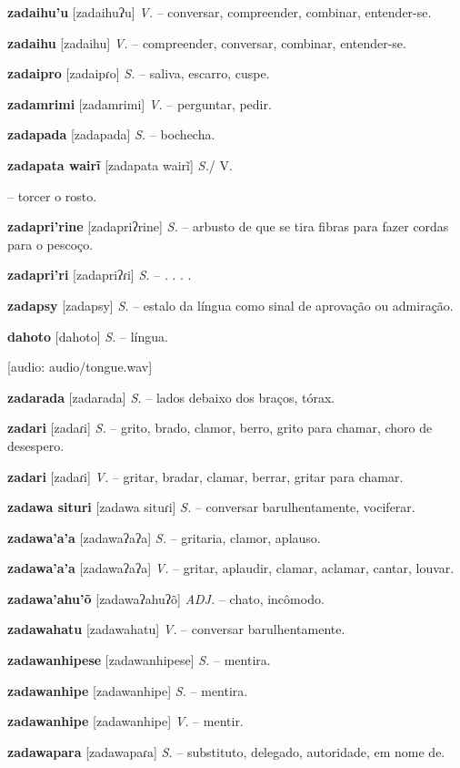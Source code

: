 {{{{{{\textbf{zadaihu'u} [zadaihuʔu] \textit{V.} -- conversar, compreender, combinar, entender-se.

\textbf{zadaihu} [zadaihu] \textit{V.} -- compreender, conversar, combinar, entender-se.

\textbf{zadaipro} [zadaipɾo] \textit{S.} -- saliva, escarro, cuspe.

\textbf{zadamrimi} [zadamrimi] \textit{V.} -- perguntar, pedir.

\textbf{zadapada} [zadapada] \textit{S.} -- bochecha.

\textbf{zadapata wairĩ} [zadapata wairĩ] \textit{S.}/ V.} -- torcer o rosto.

\textbf{zadapri'rine} [zadapriʔrine] \textit{S.} -- arbusto de que se tira fibras para fazer cordas para o pescoço.

\textbf{zadapri'ri} [zadapriʔɾi] \textit{S.} -- . . . .

\textbf{zadapsy} [zadapsy] \textit{S.} -- estalo da língua como sinal de aprovação ou admiração.

\textbf{dahoto} [dahoto] \textit{S.} -- língua.} [audio: audio/tongue.wav]

\textbf{zadarada} [zadarada] \textit{S.} -- lados debaixo dos braços, tórax.

\textbf{zadari} [zadaɾi] \textit{S.} -- grito, brado, clamor, berro, grito para chamar, choro de desespero.

\textbf{zadari} [zadaɾi] \textit{V.} -- gritar, bradar, clamar, berrar, gritar para chamar.

\textbf{zadawa situri} [zadawa situɾi] \textit{S.} -- conversar barulhentamente, vociferar.

\textbf{zadawa'a'a} [zadawaʔaʔa] \textit{S.} -- gritaria, clamor, aplauso.

\textbf{zadawa'a'a} [zadawaʔaʔa] \textit{V.} -- gritar, aplaudir, clamar, aclamar, cantar, louvar.

\textbf{zadawa'ahu'õ} [zadawaʔahuʔõ] \textit{ADJ.} -- chato, incômodo.

\textbf{zadawahatu} [zadawahatu] \textit{V.} -- conversar barulhentamente.

\textbf{zadawanhipese} [zadawanhipese] \textit{S.} -- mentira.

\textbf{zadawanhipe} [zadawanhipe] \textit{S.} -- mentira.

\textbf{zadawanhipe} [zadawanhipe] \textit{V.} -- mentir.

\textbf{zadawapara} [zadawapaɾa] \textit{S.} -- substituto, delegado, autoridade, em nome de.

}}}}
